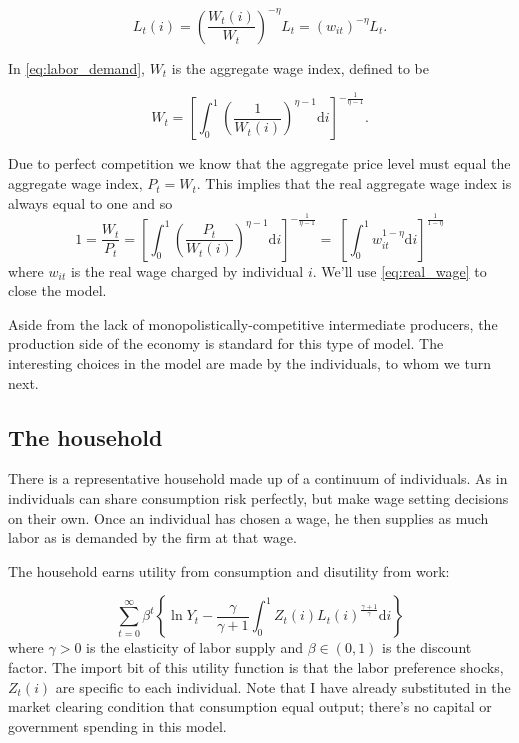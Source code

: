\documentclass[12pt,a4paper]{scrartcl}            %
\begin{document}
\begin{equation}
    \label{eq:labor_demand}
    L_t(i) = \left( \frac{W_t(i)}{W_t} \right)^{-\eta}L_t = (w_{it})^{-\eta}L_t.
\end{equation}

In \eqref{eq:labor_demand}, $W_t$ is the aggregate wage index, defined to be

\begin{equation} \label{eq:wage_index}
    W_t = \left[\int_{0}^{1}\left(\frac{1}{W_t(i)}\right)^{\eta - 1} \mathrm{d}i \right]^{-\frac{1}{\eta - 1}}.
\end{equation}

Due to perfect competition we know that the aggregate price level must equal the aggregate wage index, $P_t = W_t$.  This implies that the real aggregate wage index is always equal to one and so
%
\begin{equation} \label{eq:real_wage}
    1 = \frac{W_t}{P_t} = \left[\int_{0}^{1} \left( \frac{P_t}{W_t(i)} \right)^{\eta - 1} \mathrm{d}i \right]^{-\frac{1}{\eta - 1} }\!\!\!\! = \ \left[\int_{0}^{1} \! w_{it}^{1 - \eta} \mathrm{d}i \right]^{ \frac{1}{1 - \eta} }
\end{equation}
%
where $w_{it}$ is the real wage charged by individual $i$.
We'll use \eqref{eq:real_wage} to close the model.

Aside from the lack of monopolistically-competitive intermediate producers, the production side of the economy is standard for this type of model.
The interesting choices in the model are made by the individuals, to whom we turn next.

\subsection{The household}
\label{sub:The household}

There is a representative household made up of a continuum of individuals.
As in \cite{erceg_henderson_levin_1999} individuals can share consumption risk perfectly, but make wage setting decisions on their own.
Once an individual has chosen a wage, he then supplies as much labor as is demanded by the firm at that wage.

The household earns utility from consumption and disutility from work:

\begin{equation} \label{eq:utility}
    \sum_{t=0}^{\infty} \beta^t \left\{\ln Y_t - \frac{\gamma}{\gamma + 1} \int_{0}^{1} Z_t(i)L_t(i)^{\frac{\gamma + 1}{\gamma}}\mathrm{d}i\right\}
\end{equation}
%
where $\gamma > 0$ is the elasticity of labor supply and $\beta \in (0, 1)$ is the discount factor.
The import bit of this utility function is that the labor preference shocks, $Z_t(i)$ are specific to each individual.
Note that I have already substituted in the market clearing condition that consumption equal output;
there's no capital or government spending in this model.
\end{document}
